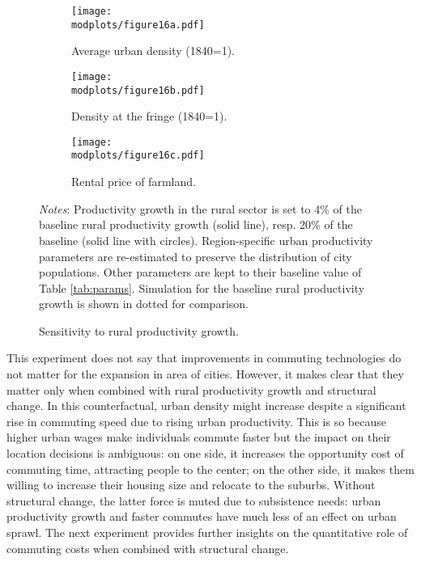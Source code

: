 \documentclass[./20250130-paper.tex]{subfiles}
\begin{document}
\begin{figure}[p]
	\begin{adjustbox}{center}
		\begin{subfigure}{\pthree\textwidth}
			\texttt{[image: \\modplots/figure16a.pdf]}
			\caption{Average urban density (1840=1).\label{fig:model-sensi-thetar-avgd}}
		\end{subfigure}
		\begin{subfigure}{\pthree\textwidth}
			\texttt{[image: \\modplots/figure16b.pdf]}
			\caption{Density at the fringe (1840=1).\label{fig:model-sensi-thetar-dr}}
		\end{subfigure}
		\begin{subfigure}{\pthree\textwidth}
			\texttt{[image: \\modplots/figure16c.pdf]}
			\caption{Rental price of farmland.\label{fig:model-sensi-thetar-rhor}}
		\end{subfigure}
	\end{adjustbox}
	\caption{Sensitivity to rural productivity growth.\label{fig:model-sensi-thetar}}
	
	{\footnotesize \textit{Notes}: Productivity growth in the rural sector is set to 4\% of the baseline rural productivity growth (solid line), resp. 20\% of the baseline (solid line with circles). Region-specific urban productivity parameters are re-estimated to preserve the distribution of city populations. Other parameters are kept to their baseline value of Table \ref{tab:params}. Simulation for the baseline rural productivity growth is shown in dotted for comparison.}
\end{figure}

This experiment does not say that improvements in commuting technologies do not matter for the expansion in area of cities. However, it makes clear that they matter only when combined with rural productivity growth and structural change. In this counterfactual, urban density might increase despite a significant rise in commuting speed due to rising urban productivity. This is so because higher urban wages make individuals commute faster but the impact on their location decisions is ambiguous: on one side, it increases the opportunity cost of commuting time, attracting people to the center; on the other side, it makes them willing to increase their housing size and relocate to the suburbs. Without structural change, the latter force is muted due to subsistence needs: urban productivity growth and faster commutes have much less of an effect on urban sprawl. The next experiment provides further insights on the quantitative role of commuting costs when combined with structural change.
\end{document}
